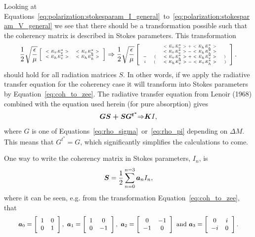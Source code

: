 Looking at Equations~\ref{eq:polarization:stokesparam_I_general}~to~\ref{eq:polarization:stokesparam_V_general} we see that there should be a transformation possible such that the coherency matrix is described in Stokes parameters. This transformation
\begin{equation}\label{eq:coh_to_zee}\tiny
\frac{1}{2}\sqrt{\frac{\epsilon}{\mu}}
  \left[
    \begin{array}{cc}
      <E_v E_v^\ast>&<E_v E_h^\ast>\\
      <E_h E_v^\ast>&<E_h E_h^\ast>
    \end{array}
  \right] 
\Rightarrow
\frac{1}{2}\sqrt{\frac{\epsilon}{\mu}}
  \left[
    \begin{array}{cccc}
      &&<E_v E_v^\ast>+<E_h E_h^\ast>\\
      &&<E_v E_v^\ast>-<E_h E_h^\ast>\\
      -&(&<E_v E_h^\ast>+<E_h E_v^\ast>&)\\
      i&\left(\right.&<E_h E_v^\ast>-<E_v E_h^\ast>&\left.\right)
    \end{array} 
  \right].
\end{equation}
should hold for all radiation matrices \boldmath$S$\unboldmath. In other words, if we apply the radiative transfer
equation for the coherency case it will transform into Stokes parameters by Equation~\ref{eq:coh_to_zee}. The radiative transfer equation from Lenoir (1968) combined with the equation used herein (for pure absorption) gives 
$$\mbox{\boldmath$GS +SG^{t^\ast}$\unboldmath$ \Rightarrow $\boldmath$K$}I,$$
where {\boldmath$G$} is one of Equations~\ref{eq:rho_sigma}~or~\ref{eq:rho_pi} depending on $\Delta M$. This means that {\boldmath$G^{t^\ast} = G$}, which significantly simplifies the calculations to come.

One way to write the coherency matrix in Stokes parameters, $I_n$, is
\begin{equation}
 \mbox{\boldmath$S$} = \frac{1}{2}\sum_{n=0}^{n=3}\mbox{\boldmath$a$}_nI_n,\label{eq:a_iI_i}
\end{equation}
where it can be seen, e.g. from the transformation Equation~\ref{eq:coh_to_zee}, that
\begin{equation}\small
 \mbox{\boldmath$a$}_0 = \left[\begin{array}{cc}
       1&0\\0&1 
       \end{array}\right], \mbox{ }
 \mbox{\boldmath$a$}_1 = \left[\begin{array}{cc}
       1&0\\0&-1 
       \end{array}\right], \mbox{ }
 \mbox{\boldmath$a$}_2 = \left[\begin{array}{cc}
       0&-1\\-1&0 
       \end{array}\right]\mbox{ and }
 \mbox{\boldmath$a$}_3 = \left[\begin{array}{cc}
       0&i\\-i&0 
       \end{array}\right].
\end{equation}

